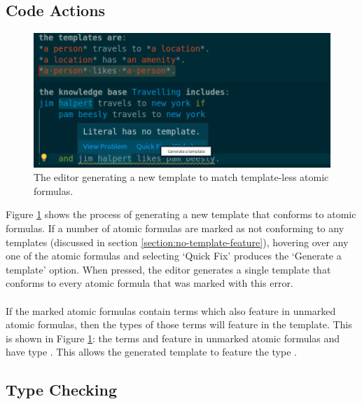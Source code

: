 \documentclass[../main.tex]{subfiles}
\begin{document}
\subsection{Code Actions}
\begin{figure}[h!]
\centering
\includegraphics[width = \linewidth]{./figures/generate-template-full.png}
\caption{The editor generating a new template to match template-less atomic formulas.}
\label{fig:new-template}
\end{figure}
Figure \ref{fig:new-template} shows the process of generating a new template that conforms to atomic formulas. If a number of atomic formulas are marked as not conforming to any templates (discussed in section \ref{section:no-template-feature}), hovering over any one of the atomic formulas and selecting `Quick Fix' produces the `Generate a template' option. When pressed, the editor generates a single template that conforms to every atomic formula that was marked with this error. 
\\
\\
If the marked atomic formulas contain terms which also feature in unmarked atomic formulas, then the types of those terms will feature in the template. This is shown in Figure \ref{fig:new-template}: the terms  and  feature in unmarked atomic formulas and have type . This allows the generated template to feature the type .

\subsection{Type Checking}
\end{document}
